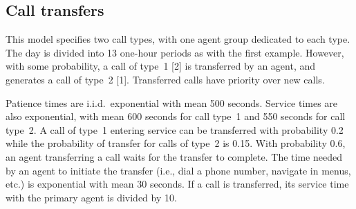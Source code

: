 \begin{comment}
Each time a simulation is performed with these parameters, data in
table is cleared, and the table is filled with the new
call-by-call trace.

For example, the data source \texttt{datasource} can be backed by an
Excel file as follows.
First, one needs to create a new Excel spreadsheet with at least one
sheet, named \texttt{CallTrace}.
(The ODBC driver maps this sheet to a table named
\texttt{[CallTrace\$]}.)
In the first row of the \texttt{CallTrace} sheet, one must create
eight columns with any name before saving the Excel spreadsheet.

Then, one must access the \textbf{Administrative Tools} from
\textbf{Control Panel}, and
select \textbf{Data Sources (ODBC)}.
One then selects the type of the data source (system, user, or file)
according to its needs.
For testing purposes, the default type (user) is recommended.
One then clicks on the \textbf{Add} button to setup the new
data source.

In this example, we select the Microsoft Excel driver, and name the
source \texttt{datasource}.  One can also provide a description, but
it is not used by the program.
One clicks on \textbf{Select Workbook} to select the spreadsheet to
link to the data source.
One must ensure that the \textbf{Read only} option of the dialog box
for file selection is disabled, or the trace writing will fail.

Before starting simulation, it is recommended to close the Excel
spreadsheet for maximal speed of writing.
\end{comment}

\subsection{Call transfers}
\label{sec:callTransfers}

This model specifies two call types, with one agent group dedicated to
each type.
The day is divided into 13 one-hour periods as with the first example.
However, with some probability, a call  of type~1 [2] is transferred
by an agent, and generates a call of type~2 [1].
Transferred calls have priority over new calls.

Patience times are i.i.d.\ exponential with mean 500 seconds.
Service times are also exponential, with mean 600 seconds for call
type~1 and 550 seconds for call type~2.
A call of type~1 entering service can be transferred with probability
0.2 while the probability of transfer for calls of type~2 is 0.15.
With probability 0.6, an agent transferring a call waits for the
transfer to complete.
The time needed by an agent to initiate the transfer (i.e., dial a phone
number, navigate in menus, etc.) is exponential with
mean 30 seconds.
If a call is transferred, its service time with the primary agent is
divided by 10.

